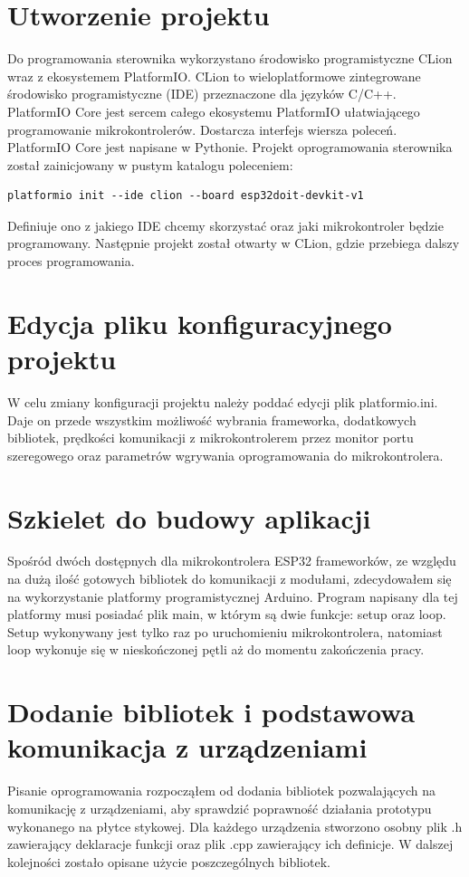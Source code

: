 \documentclass[11pt]{report}
\begin{document}
 \section{Utworzenie projektu}
 Do programowania sterownika wykorzystano środowisko programistyczne CLion wraz z ekosystemem PlatformIO.
 CLion to wieloplatformowe zintegrowane środowisko programistyczne (IDE) przeznaczone dla języków C/C++.
 PlatformIO Core jest sercem całego ekosystemu PlatformIO ułatwiającego programowanie mikrokontrolerów. Dostarcza interfejs wiersza poleceń. PlatformIO Core jest napisane w Pythonie.
 Projekt oprogramowania sterownika został zainicjowany w pustym katalogu poleceniem:
 \begin{lstlisting}
platformio init --ide clion --board esp32doit-devkit-v1 
 \end{lstlisting}
 Definiuje ono z jakiego IDE chcemy skorzystać oraz jaki mikrokontroler będzie programowany.
 Następnie projekt został otwarty w CLion, gdzie przebiega dalszy proces programowania.
 
 \section{Edycja pliku konfiguracyjnego projektu}
 W celu zmiany konfiguracji projektu należy poddać edycji plik platformio.ini. Daje on przede wszystkim możliwość wybrania frameworka, dodatkowych bibliotek, prędkości komunikacji z mikrokontrolerem przez monitor portu szeregowego oraz parametrów wgrywania oprogramowania do mikrokontrolera.
 
 \section{Szkielet do budowy aplikacji}
 Spośród dwóch dostępnych dla mikrokontrolera ESP32 frameworków, ze względu na dużą ilość gotowych bibliotek do komunikacji z modułami, zdecydowałem się na wykorzystanie platformy programistycznej Arduino.
 Program napisany dla tej platformy musi posiadać plik main, w którym są dwie funkcje: setup oraz loop.
 Setup wykonywany jest tylko raz po uruchomieniu mikrokontrolera, natomiast loop wykonuje się w nieskończonej pętli aż do momentu zakończenia pracy.
 
 \section{Dodanie bibliotek i podstawowa komunikacja z urządzeniami}
 Pisanie oprogramowania rozpocząłem od dodania bibliotek pozwalających na komunikację z urządzeniami, aby sprawdzić poprawność działania prototypu wykonanego na płytce stykowej. Dla każdego urządzenia stworzono osobny plik .h zawierający deklaracje funkcji oraz plik .cpp zawierający ich definicje.
 W dalszej kolejności zostało opisane użycie poszczególnych bibliotek.
\end{document}

